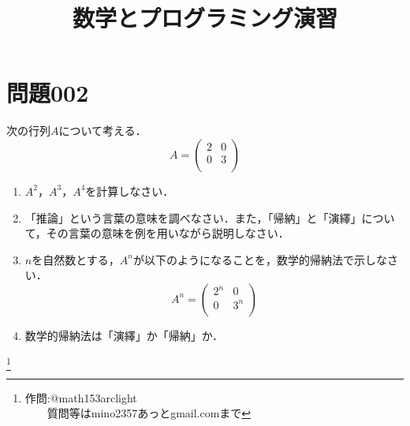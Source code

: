 \documentclass[12pt]{jarticle}
\title{数学とプログラミング演習}
\date{}
\begin{document}
\maketitle

\section*{問題002}
次の行列$A$について考える．
\[
  A = \left(
    \begin{array}{ccc}
      2 & 0 \\
      0 & 3 \\
    \end{array}
  \right)
\]


\begin{enumerate}
\renewcommand{\labelenumi}{(\arabic{enumi})}
\item $A^2$，$A^3$，$A^4$を計算しなさい．
\item 「推論」という言葉の意味を調べなさい．また，「帰納」と「演繹」について，その言葉の意味を例を用いながら説明しなさい．
\item $n$を自然数とする，$A^{n}$が以下のようになることを，数学的帰納法で示しなさい．
\[
  A^{n} = \left(
    \begin{array}{ccc}
      2^n & 0 \\
      0 & 3^n \\
    \end{array}
  \right)
\]
\item 数学的帰納法は「演繹」か「帰納」か．
\end{enumerate}


\footnote[0]{
作問:@math153arclight\\
　　質問等はmino2357あっとgmail.comまで
}

\thispagestyle{empty}
\end{document}

